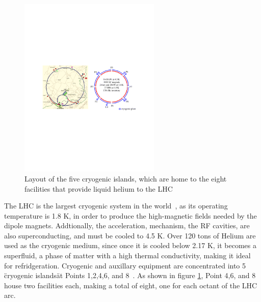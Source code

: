 \begin{figure}[h]
   \centering
  \includegraphics[width=0.6\textwidth]{Figures/LHC_Diagrams/LHC_CoolingPlants.pdf}
  \caption{Layout of the five cryogenic islands, which are home to the
  eight facilities that provide liquid helium to the LHC} \label{fig:lhc_cryogenic_islands}
\end{figure}

\par The LHC is the largest cryogenic system in the
world~\cite{LHC:LHC_lhc_cryogen_cernWebsite}, as its operating
temperature is 1.8 K, in order to produce the high-magnetic fields
needed by the dipole magnets.  Addtionally, the acceleration,
mechanism, the RF cavities, are also superconducting, and must be
cooled to 4.5 K.  Over 120 tons of Helium are used as the cryogenic
medium, since once it is cooled below 2.17 K, it becomes a superfluid,
a phase of matter with a high thermal conductivity, making it ideal
for refridgeration.  Cryogenic and auxillary equipment are
concentrated into 5 \"cryogenic islands\" at Points 1,2,4,6, and
8~\cite{lhc:machine_description}.  As shown in figure
\ref{fig:lhc_cryogenic_islands}, Point 4,6, and 8 house two facilities
each, making a total of eight, one for each octant of the LHC arc. 

